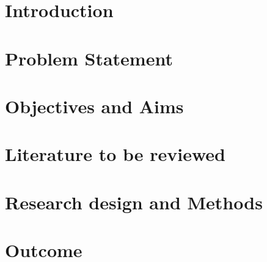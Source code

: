 




\clearpage

\section{Introduction}
\sffamily
\lipsum

\rmfamily
\section{Problem Statement}
\sffamily
\lipsum

\rmfamily
\clearpage
\section{Objectives and Aims}
\sffamily
\lipsum

\rmfamily
\clearpage
\section{Literature to be reviewed}
\sffamily
\lipsum

\rmfamily
\clearpage
\section{Research design and Methods}
\sffamily
\lipsum

\rmfamily

\section{Outcome}
\sffamily
\lipsum

